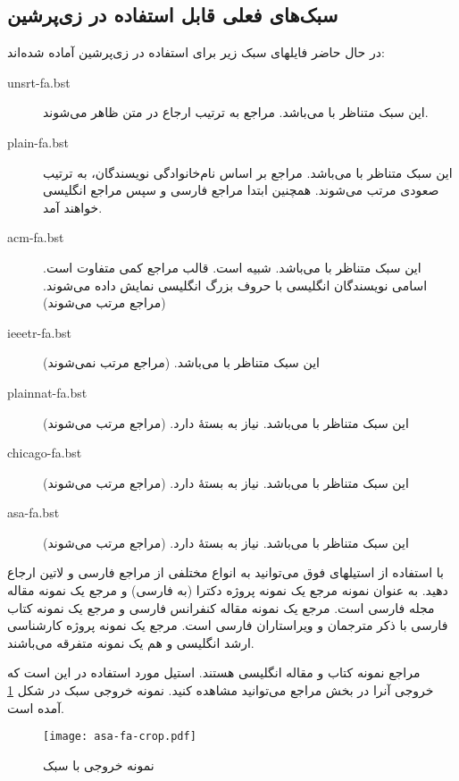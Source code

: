 \subsection{سبک‌های فعلی قابل استفاده در زی‌پرشین}
در حال حاضر فایلهای سبک زیر برای استفاده در زی‌پرشین آماده شده‌اند:

\singlespacing
\begin{description}
\item [unsrt-fa.bst] این سبک متناظر با  می‌باشد. مراجع به ترتیب ارجاع در متن ظاهر می‌شوند.
\item [plain-fa.bst] این سبک متناظر با  می‌باشد. مراجع بر اساس نام‌خانوادگی نویسندگان، به ترتیب صعودی مرتب می‌شوند.
 همچنین ابتدا مراجع فارسی و سپس مراجع انگلیسی خواهند آمد.
\item [acm-fa.bst] این سبک متناظر با  می‌باشد. شبیه  است.  قالب مراجع کمی متفاوت است. اسامی نویسندگان انگلیسی با حروف بزرگ انگلیسی نمایش داده می‌شوند. (مراجع مرتب می‌شوند)
\item [ieeetr-fa.bst] این سبک متناظر با  می‌باشد. (مراجع مرتب نمی‌شوند)
\item [plainnat-fa.bst] این سبک متناظر با  می‌باشد. نیاز به بستهٔ  دارد. (مراجع مرتب می‌شوند)
\item [chicago-fa.bst] این سبک متناظر با  می‌باشد. نیاز به بستهٔ  دارد. (مراجع مرتب می‌شوند)
\item [asa-fa.bst] این سبک متناظر با  می‌باشد. نیاز به بستهٔ  دارد. (مراجع مرتب می‌شوند)
\end{description}
\doublespacing

با استفاده از استیلهای فوق می‌توانید به انواع مختلفی از مراجع فارسی و لاتین ارجاع دهید. به عنوان نمونه مرجع 
\cite{Omidali82phdThesis}
 یک نمونه پروژه دکترا (به فارسی) و مرجع 
\cite{Vahedi87} یک نمونه مقاله مجله فارسی است.
مرجع 
\cite{Amintoosi87afzayesh}  یک نمونه  مقاله کنفرانس فارسی و
مرجع 
\cite{Pedram80osool} یک نمونه کتاب فارسی با ذکر مترجمان و ویراستاران فارسی است. مرجع 
\cite{Khalighi07MscThesis} یک نمونه پروژه کارشناسی ارشد انگلیسی و
\cite{Khalighi87xepersian} هم یک نمونه متفرقه  می‌باشند.

مراجع 
\cite{Gonzalez02book,Baker02limits} 
نمونه کتاب و مقاله انگلیسی هستند.
استیل مورد استفاده در این \پ  است که خروجی آنرا در بخش مراجع می‌توانید مشاهده کنید.
نمونه  خروجی سبک  در شکل \ref{fig:asafa} آمده است.

\begin{figure}[t]
\centering
\texttt{[image: asa-fa-crop.pdf]}
\caption{نمونه خروجی با سبک }
\label{fig:asafa}
\end{figure} 

